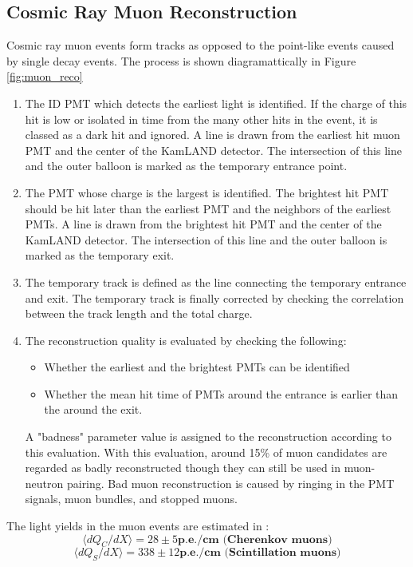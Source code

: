 \subsection*{Cosmic Ray Muon Reconstruction}
Cosmic ray muon events form tracks as opposed to the point-like events caused by single decay events. The process is shown diagramattically in Figure \ref{fig:muon_reco}
\begin{enumerate}
	\item The ID PMT which detects the earliest light is identified. If the charge of this hit is low or isolated in time from the many other hits in the event, it is classed as a dark hit and ignored. A line is drawn from the earliest hit muon PMT and the center of the KamLAND detector. The intersection of this line and the outer balloon is marked as the temporary entrance point.
	\item The PMT whose charge is the largest is identified. The brightest hit PMT should be hit later than the earliest PMT and the neighbors of the earliest PMTs. A line is drawn from the brightest hit PMT and the center of the KamLAND detector. The intersection of this line and the outer balloon is marked as the temporary exit.
	\item The temporary track is defined as the line connecting the temporary entrance and exit. The temporary track is finally corrected by checking the correlation between the track length and the total charge.
	\item The reconstruction quality is evaluated by checking the following:
	\begin{itemize}
		\item Whether the earliest and the brightest PMTs can be identified
		\item Whether the mean hit time of PMTs around the entrance is earlier than the around the exit.
	\end{itemize}
	A "badness" parameter value is assigned to the reconstruction according to this evaluation. With this evaluation, around 15\% of muon candidates are regarded as badly reconstructed though they can still be used in muon-neutron pairing. Bad muon reconstruction is caused by ringing in the PMT signals, muon bundles, and stopped muons.
\end{enumerate}
The light yields in the muon events are estimated in \cite{karino_master}:
\begin{equation}
	\langle dQ_C/dX\rangle =28\pm 5\textbf{p.e./cm (Cherenkov muons)}
\end{equation}
\begin{equation}
	\langle dQ_S/dX\rangle =338\pm 12\textbf{p.e./cm (Scintillation muons)}
\end{equation}
